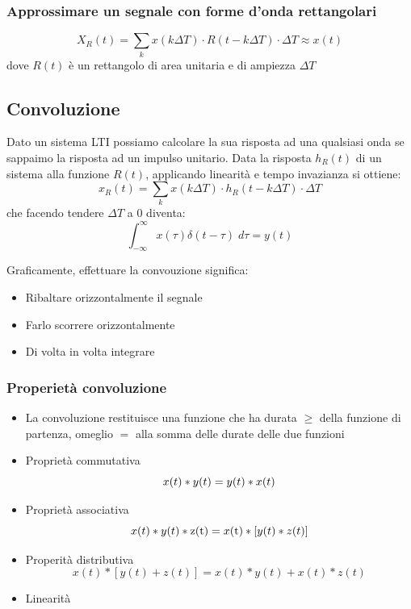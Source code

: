 \subsubsection*{Approssimare un segnale con forme d'onda rettangolari}
\[
	X_R\left(t\right) = \sum_{k} x\left(k \Delta T\right) \cdot R\left(t - k  \Delta T\right) \cdot  \Delta T \approx x\left(t\right)
\]
dove $ R\left(t\right) $ è un rettangolo di area unitaria e di ampiezza $ \Delta T $
\subsection{Convoluzione}
Dato un sistema  LTI possiamo calcolare la sua risposta ad una qualsiasi onda se sappaimo la risposta ad un impulso unitario. Data la risposta $ h_R\left(t\right) $ di un sistema alla funzione $ R\left(t\right) $, applicando linearità e tempo invazianza si ottiene:
\[
	x_R\left(t\right) = \sum_{k} x\left(k \Delta T\right) \cdot h_R\left(t - k  \Delta T\right) \cdot  \Delta T
\]
che facendo tendere $ \Delta T $ a 0 diventa:
\[
	\int_{-\infty }^{\infty } x\left(\tau \right) \delta \left(t-\tau \right)  \; d \tau = y\left(t\right)
\]

Graficamente, effettuare la convouzione significa:
\begin{itemize}
	\item Ribaltare orizzontalmente il segnale
	\item Farlo scorrere orizzontalmente
	\item Di volta in volta integrare
\end{itemize}
\subsubsection*{Properietà convoluzione}
\begin{itemize}
	\item La convoluzione restituisce una funzione che ha durata $ \ge  $ della funzione di partenza, omeglio $ =  $ alla somma delle durate delle due funzioni
	\item Proprietà commutativa
	      \[
		      x(t) * y(t)=y(t) * x(t) \\
	      \]
	\item Proprietà associativa
	      \[
		      x(t) * y(t) * \mathrm{z}(\mathrm{t})=x(\mathrm{t}) *[y(t) * z(t)] \\
	      \]
	\item Properità distributiva
	      \[
		      x(t) *[y(t)+z(t)]=x(t) * y(t)+x(t) * z(t)
	      \]
	\item Linearità
	      \[
	      \]
\end{itemize}
